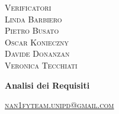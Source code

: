 \documentclass[8pt]{article}
\begin{document}
\begin{titlepage}
\begin{minipage}[t]{0.47\textwidth}
{		}
		\vspace{8mm}
		
		{\large{\textsc{Verificatori}}
			\vspace{3mm}
			{\\\large{\textsc{Linda Barbiero}\\}}
                {\large{\textsc{Pietro Busato}\\}}
                {\large{\textsc{Oscar Konieczny}\\}} 
                {\large{\textsc{Davide Donanzan}\\}}
                {\large{\textsc{Veronica Tecchiati}\\}}
                {} %
		}
		\vspace{2mm}\vspace{2mm}
	\end{minipage}
	\vspace{4cm}
	\begin{center}
		\begin{flushright}
			{\fontsize{30pt}{52pt}\selectfont \textbf{Analisi dei Requisiti\\}} %
		\end{flushright}
		\vspace{3cm}
	\end{center}
	\vspace{8cm}
	{\small \textsc{\href{mailto: nan1fyteam.unipd@gmail.com}{\color{black}nan1fyteam.unipd@gmail.com}}}
\end{titlepage}
\pagestyle{mystyle}
\end{document}
